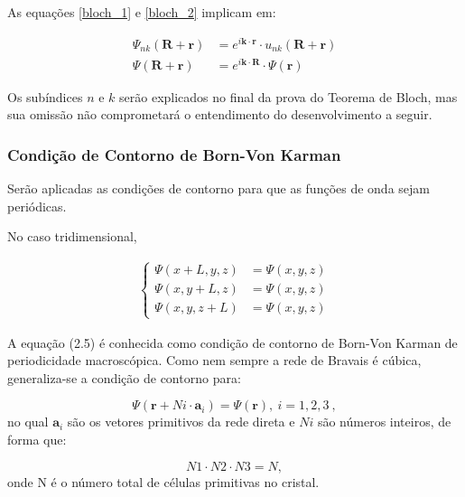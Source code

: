 	As equações \eqref{bloch_1} e \eqref{bloch_2} implicam em:

	\begin{align}
		\label{bloch_3}
		\Psi_{nk}(\mathbf{R} + \mathbf{r}) &= e^{i\mathbf{k} \cdot \mathbf{r}}\cdot u_{nk}(\mathbf{R} + \mathbf{r})\\
		\Psi(\mathbf{R} + \mathbf{r}) &= e^{i\mathbf{k} \cdot \mathbf{R}}\cdot \Psi(\mathbf{r})
	\end{align}

	\par Os subíndices $n$ e $k$ serão explicados no final da prova do Teorema de Bloch, mas sua omissão não comprometará o entendimento do desenvolvimento a seguir.



	\subsubsection{Condição de Contorno de Born-Von Karman}

		\par Serão aplicadas as condições de contorno para que as funções de onda sejam periódicas.
		
		\par No caso tridimensional,

		\begin{align}\label{bloch_4}
	        \left\{
	          \begin{array}{ll}
	            \displaystyle \Psi(x+L, y, z) &= \Psi(x, y, z)\\
	            \displaystyle \Psi(x, y+L, z) &= \Psi(x, y, z)\\
	            \displaystyle \Psi(x, y, z+L) &= \Psi(x, y, z)
	          \end{array}
	        \right.
	      \end{align}
		
		\par A equação (2.5) é conhecida como condição de contorno de Born-Von Karman de periodicidade macroscópica.  Como nem sempre a rede de Bravais é cúbica, generaliza-se a condição de contorno para:

		\begin{equation}
			\label{blochh_5}
			\Psi(\mathbf{r} + N i\cdot \mathbf{a}_{i}) = \Psi(\mathbf{r}),\ i=1,2,3\ ,
		\end{equation}
		no qual $\mathbf{a}_{i}$ são os vetores primitivos da rede direta e $Ni$ são números inteiros, de forma que:

		\begin{equation}
			\label{bloch_6}
			N1 \cdot N2 \cdot N3 = N,
		\end{equation}
		onde N é o número total de células primitivas no cristal.

